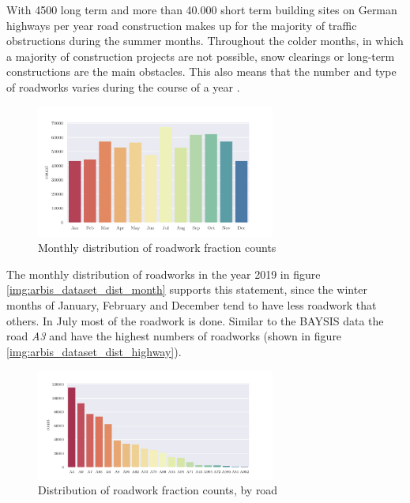 With 4500 long term and more than 40.000 short term building sites on German highways per year \parencite{LAPID2018,Stmi2020} road construction makes up for the majority of traffic obstructions during the summer months. Throughout the colder months, in which a majority of construction projects are not possible, snow clearings or long-term constructions are the main obstacles. This also means that the number and type of roadworks varies during the course of a year \parencite{Stmi2020}. 
\begin{figure}[ht]
	\centering
	\includegraphics[width=0.7\textwidth]{../CorrAnalysis/data/ArbIS/01_dataset/plots/arbis_dataset_hist_month}
	\caption{Monthly distribution of roadwork fraction counts}
	\label{img:arbis_dataset_dist_month}
\end{figure}
The monthly distribution of roadworks in the year 2019 in figure \autoref{img:arbis_dataset_dist_month} supports this statement, since the winter months of January, February and December tend to have less roadwork that others. In July most of the roadwork is done. Similar to the BAYSIS data the road \textit{A3} and  have the highest numbers of roadworks (shown in figure \autoref{img:arbis_dataset_dist_highway}).
\begin{figure}[ht]
	\centering
	\includegraphics[width=0.7\textwidth]{../CorrAnalysis/data/ArbIS/01_dataset/plots/arbis_dataset_hist_highway}
	\caption{Distribution of roadwork fraction counts, by road}
	\label{img:arbis_dataset_dist_highway}
\end{figure}

